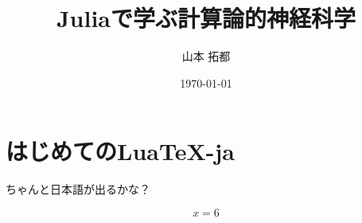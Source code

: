 \documentclass[tombow, paper={182truemm, 232truemm}, titlepage]{ltjsbook}
\title{\Huge \textbf{Juliaで学ぶ計算論的神経科学}}
\author{\huge 山本 拓都}
\date{\huge \today}
\begin{document}
\maketitle

\section{はじめてのLua\TeX-ja}
ちゃんと日本語が出るかな？

$$
  x = 6
$$



\end{document}
